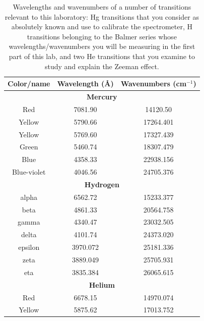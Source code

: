 \documentclass{../lab}
\begin{document}
\begin{table}[t]
\begin{center}
\bgroup
\def\arraystretch{1.2}
\begin{tabular}{|c|c|c|}
        \hline Color/name & Wavelength (\AA) & Wavenumbers (cm$^{-1}$) \\ \hline
       \multicolumn{3}{|c|}{ \textbf{Mercury} }   \\ \hline
        Red          &  7081.90   &  14120.50 \\ \hline
        Yellow       &  5790.66   &  17264.401 \\ \hline
        Yellow       &  5769.60   &  17327.439 \\ \hline
        Green        &  5460.74   &  18307.479 \\ \hline
        Blue         &  4358.33   &  22938.156 \\ \hline
        Blue-violet  &  4046.56   &  24705.376 \\ \hline
       \multicolumn{3}{|c|}{ \textbf{Hydrogen} }   \\ \hline
        alpha        &  6562.72   &  15233.377 \\ \hline
        beta         &  4861.33   &  20564.758 \\ \hline
        gamma        &  4340.47   &  23032.505 \\ \hline
        delta        &  4101.74   &  24373.020 \\ \hline
        epsilon      &  3970.072  &  25181.336 \\ \hline
          zeta           &  3889.049  &  25705.931 \\ \hline
          eta           &  3835.384  &  26065.615 \\ \hline
          \multicolumn{3}{|c|}{ \textbf{Helium} }   \\ \hline
        Red          &  6678.15   &  14970.074 \\ \hline
        Yellow       &  5875.62   &  17013.752 \\ \hline

    \end{tabular}
\egroup
\caption{Wavelengths and wavenumbers of a number of transitions relevant to this laboratory: Hg transitions that you consider as absolutely known and use to calibrate the spectrometer, H transitions belonging to the Balmer series whose wavelengths/wavenumbers you will be measuring in the first part of this lab, and two He transitions that you examine to study and explain the Zeeman effect.}
    \label{tab:wavelengths}
\end{center}
\end{table}
\end{document}
